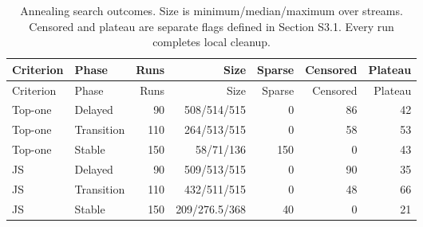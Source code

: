 \begingroup\small\setlength{\tabcolsep}{4pt}
\begin{longtable}{llrrrrr}
\caption{Annealing search outcomes. Size is minimum/median/maximum over streams. Censored and plateau are separate flags defined in Section S3.1. Every run completes local cleanup.}\label{tab:searchsummary}\\
\toprule
Criterion & Phase & Runs & Size & Sparse & Censored & Plateau \\

\midrule\endfirsthead
\toprule
Criterion & Phase & Runs & Size & Sparse & Censored & Plateau \\

\midrule\endhead
\bottomrule\endfoot
Top-one & Delayed & 90 & 508/514/515 & 0 & 86 & 42 \\
Top-one & Transition & 110 & 264/513/515 & 0 & 58 & 53 \\
Top-one & Stable & 150 & 58/71/136 & 150 & 0 & 43 \\
JS & Delayed & 90 & 509/513/515 & 0 & 90 & 35 \\
JS & Transition & 110 & 432/511/515 & 0 & 48 & 66 \\
JS & Stable & 150 & 209/276.5/368 & 40 & 0 & 21 \\
\end{longtable}
\endgroup
